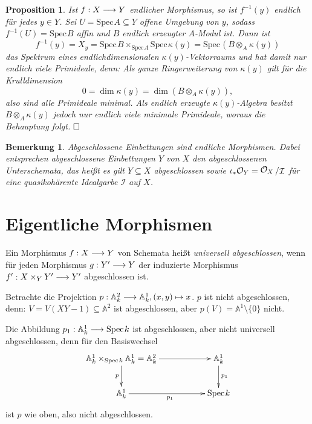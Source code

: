 \documentclass[11pt]{book}
\newtheorem{proposition}[theorem]{Proposition}
\newtheorem{remark}[theorem]{Bemerkung}
\theoremstyle{nonumberbreak}
\newenvironment{defin}[1][]{\ifthenelse{\equal{#1}{}}{\definition}{\definition[#1]}\rm}{\enddefinition}
\newenvironment{pr}[1][]{\ifthenelse{\equal{#1}{}}{\proof}{\proof[#1]}\rm}{\endproof}
\newenvironment{ex}[1][]{\ifthenelse{\equal{#1}{}}{\example}{\example[#1]}\rm}{\endexample}
\newcommand{\spec}{\mathrm{Spec} \hspace{1pt} }
\newcommand{\slant}[2]{{\raisebox{.1em}{$#1$}\left/\raisebox{-.1em}{$#2$}\right.}}
\begin{document}
\begin{spacing}{1.4}
\begin{proposition}
Ist $f: X\longrightarrow Y$ endlicher Morphismus, so ist $f^{-1}(y)$ endlich für jedes $y \in Y$.
\begin{pr}
Sei $U = \spec A \subseteq Y$ offene Umgebung von $y$, sodass $f^{-1}(U)=\spec B$ affin und $B$ endlich erzeugter $A$-Modul ist. Dann ist 
$$f^{-1}(y) = X_y = \spec B \times_{\spec A} \spec \kappa(y) = \spec \left( B \otimes_A \kappa(y)\right)$$
das Spektrum eines endlichdimensionalen $\kappa(y)$-Vektorraums und hat damit nur endlich viele Primideale, denn: Als ganze Ringerweiterung von $\kappa(y)$ gilt für die Krulldimension
$$0 = \dim \kappa(y) = \dim \left( B \otimes_A \kappa(y) \right),$$
also sind alle Primideale minimal. Als endlich erzeugte $\kappa(y)$-Algebra besitzt $B \otimes_A \kappa(y)$ jedoch nur endlich viele minimale Primideale, woraus die Behauptung folgt. $\hfill \Box$
\end{pr}

\end{proposition}



\begin{remark}
Abgeschlossene Einbettungen sind endliche Morphismen. Dabei entsprechen abgeschlossene Einbettungen $Y$ von $X$ den abgeschlossenen Unterschemata, das heißt es gilt $Y \subseteq X$ abgeschlossen sowie $\iota_{*} \mathcal{O}_Y = \slant{\Ocal_X}{\mathcal{I}}$ für eine quasikohärente Idealgarbe $\mathcal{I}$ auf $X$.
\end{remark}


\newcommand{\A}{\mathbb{A}}
\newcommand{\Pro}{\mathbb{P}}


\renewcommand*\thesection{§ \arabic{section}\quad}
\section{Eigentliche Morphismen} %
\renewcommand*\thesection{\arabic{section}}


\begin{defin}    %
Ein Morphismus $f: X \longrightarrow Y$ von Schemata heißt \textit{universell abgeschlossen}, wenn für jeden Morphismus $g: Y' \longrightarrow Y$ der induzierte Morphismus $f': X \times_Y Y' \longrightarrow Y'$ abgeschlossen ist.
\end{defin}

\begin{ex}   %
\begin{compactenum}
\item Betrachte die Projektion $p: \A^2_k \la \A^1_k, (x,y) \mapsto x$. $p$ ist nicht abgeschlossen, denn: $V=V(XY-1) \subseteq \A^2$ ist abgeschlossen, aber $p(V) = \A^1 \setminus \{0\}$ nicht.
\item Die Abbildung $p_1: \A^1_k \la \spec k$ ist abgeschlossen, aber nicht universell abgeschlossen, denn für den Basiswechsel
$$
\begin{xy}
\xymatrix{
\A^1_k \times_{\spec k} \A^1_k = \A^2_k \ar[rr] \ar[d]_{p} && \A^1_k \ar[d]^{p_1} \\
\A^1_k \ar[rr]_{p_1} && \spec k 
}
\end{xy}
$$
ist $p$ wie oben, also nicht abgeschlossen.


\end{compactenum}
\end{ex}
\end{spacing}
\end{document}
